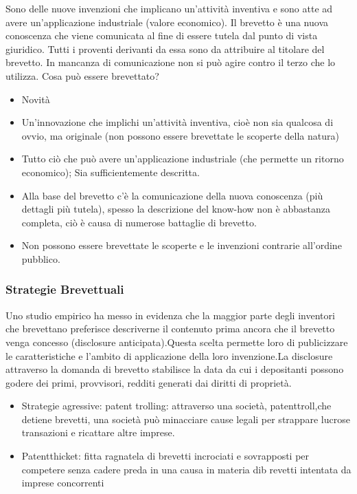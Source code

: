 \documentclass{article}
\begin{document}
Sono delle nuove invenzioni che implicano un’attività inventiva e sono atte ad avere
un’applicazione industriale (valore economico). Il brevetto è una nuova conoscenza che viene
comunicata al fine di essere tutela dal punto di vista giuridico. Tutti i proventi derivanti da essa
sono da attribuire al titolare del brevetto. In mancanza di comunicazione non si può agire contro il
terzo che lo utilizza.
Cosa può essere brevettato?
\begin{itemize}
	\item Novità
	\item Un’innovazione che implichi un’attività inventiva, cioè non sia qualcosa di ovvio, ma
	originale (non possono essere brevettate le scoperte della natura)
	\item Tutto ciò che può avere un’applicazione industriale (che permette un ritorno economico);
	Sia sufficientemente descritta.
	\item Alla base del brevetto c’è la comunicazione della nuova conoscenza (più dettagli più tutela), spesso
	la descrizione del know-how non è abbastanza completa, ciò è causa di numerose battaglie di
	brevetto.
	\item Non possono essere brevettate le scoperte e le invenzioni contrarie all’ordine pubblico.
\end{itemize}

\subsubsection{Strategie Brevettuali}
Uno studio empirico ha messo in evidenza che la maggior parte degli inventori che brevettano preferisce descriverne il contenuto prima ancora che il brevetto venga concesso (disclosure anticipata).Questa scelta permette loro di publicizzare le caratteristiche e l’ambito di applicazione della loro invenzione.La disclosure attraverso la domanda di brevetto stabilisce la data da cui i depositanti possono godere dei primi, provvisori, redditi generati dai diritti di proprietà.
\begin{itemize}
\item Strategie agressive: patent trolling: attraverso una società, patenttroll,che detiene brevetti, una società può minacciare cause legali per strappare lucrose transazioni e ricattare altre imprese. 
\item Patentthicket: fitta ragnatela di brevetti incrociati e sovrapposti per competere senza cadere preda in una  causa in materia dib revetti intentata da imprese concorrenti
\end{itemize}
\end{document}
